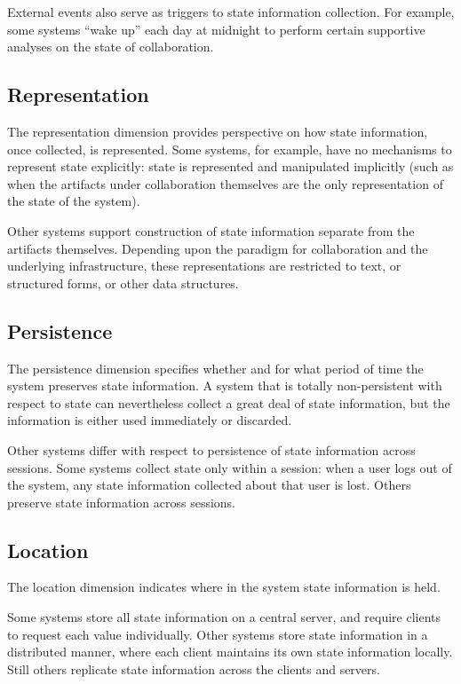 External events also serve as triggers to state information collection.
For example, some systems ``wake up'' each day at midnight to perform
certain supportive analyses on the state of collaboration. 

\subsection{Representation}

The representation dimension provides perspective on how state
information, once collected, is represented.  Some 
systems, for example, have no mechanisms to represent state 
explicitly: state is represented and manipulated implicitly (such
as when the artifacts under collaboration themselves are the 
only representation of the state of the system).  

Other systems support construction of state information
separate from the artifacts themselves.  Depending upon the 
paradigm for collaboration and the underlying infrastructure,
these representations are restricted to text, or structured
forms, or other data structures. 

\subsection{Persistence}

The persistence dimension specifies whether and for what period of time the
system preserves state information.  A system that is totally
non-persistent with respect to state can nevertheless collect a great deal
of state information, but the information is either used immediately or
discarded.

Other systems differ with respect to persistence of state information
across sessions.  Some systems collect state only within a session: when a
user logs out of the system, any state information collected about that
user is lost. Others preserve state information across sessions.

\subsection{Location}

The location dimension indicates where in the system state information is
held.  

Some systems store all state information on a central server, and
require clients to request each value individually.  Other systems
store state information in a distributed manner, where each client
maintains its own state information locally. Still others replicate state
information across the clients and servers.

